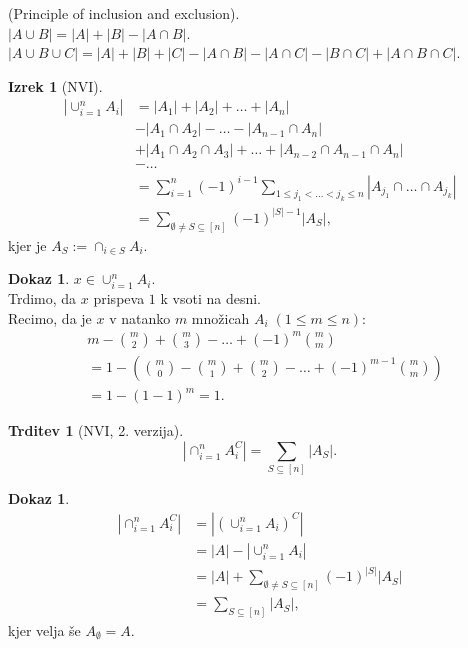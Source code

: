 \documentclass[a4paper, 12pt]{book}
\theoremstyle{definition}
\newtheorem{claim}[counter]{Trditev}
\newtheorem{theorem}[counter]{Izrek}
\newtheorem{pro}[counter]{Dokaz}
\theoremstyle{remark}
\begin{document}
(Principle of inclusion and exclusion). \\
$|A \cup B| = |A| + |B| - |A \cap B|$. \\
$|A \cup B \cup C| = |A| + |B| + |C| - |A \cap B| - |A \cap C| - |B \cap C| + |A \cap B \cap C|$.
\begin{theorem}[NVI]
  \begin{align*}
    |\cup_{i=1}^n A_i| &= |A_1| + |A_2| + \dots + |A_n| \\
    &- |A_1 \cap A_2| - \dots - |A_{n-1} \cap A_n| \\
    &+ |A_1 \cap A_2 \cap A_3| + \dots + |A_{n-2} \cap A_{n-1} \cap A_n| \\
    &- \dots \\
    &= \sum_{i=1}^{n} (-1)^{i-1} \sum_{1 \leq j_1 < \dots < j_k \leq n} |A_{j_1} \cap \dots \cap A_{j_k}| \\
    &= \sum_{\emptyset \neq S \subseteq [n]} (-1)^{|S|-1} |A_S|,
  \end{align*}
  kjer je $A_S := \cap_{i \in S} A_i$.
\end{theorem}
\begin{pro} \text{}
  $x \in \cup_{i=1}^n A_i$. \\
  Trdimo, da $x$ prispeva $1$ k vsoti na desni. \\
  Recimo, da je $x$ v natanko $m$ množicah $A_i \; (1 \leq m \leq n)$:
  \begin{align*}
    &m - \binom{m}{2} + \binom{m}{3} - \dots + (-1)^{m} \binom{m}{m} \\
    &= 1 - \left(\binom{m}{0} - \binom{m}{1} + \binom{m}{2} - \dots + (-1)^{m-1} \binom{m}{m}\right) \\
    &= 1 - (1-1)^m = 1.
  \end{align*}
\end{pro}
\begin{claim}[NVI, 2. verzija]
  \begin{equation*}
    \left|\cap_{i=1}^n A_i^C\right| = \sum_{S \subseteq [n]} |A_S|.
  \end{equation*}
\end{claim}
\begin{pro}
  \begin{align*}
    \left|\cap_{i=1}^n A_i^C\right| &= \left|(\cup_{i=1}^n A_i)^C\right| \\
    &= |A| - |\cup_{i=1}^n A_i| \\
    &= |A| + \sum_{\emptyset \neq S \subseteq [n]} (-1)^{|S|} |A_S| \\
    &= \sum_{S \subseteq [n]} |A_S|,
  \end{align*}
  kjer velja še $A_{\emptyset} = A$.
\end{pro}



%
%



\end{document}
